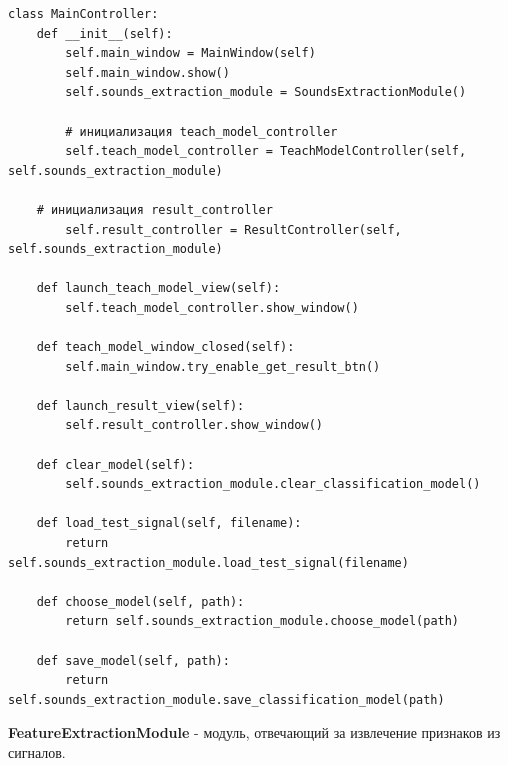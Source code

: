 \documentclass[utf8x, 14pt, oneside, a4paper]{article}
\begin{document}
		\begin{lstlisting}[caption=MainController]
class MainController:
	def __init__(self):
		self.main_window = MainWindow(self)
		self.main_window.show()
		self.sounds_extraction_module = SoundsExtractionModule()
		
		# инициализация teach_model_controller
		self.teach_model_controller = TeachModelController(self, self.sounds_extraction_module)
	
	# инициализация result_controller
		self.result_controller = ResultController(self, self.sounds_extraction_module)
	
	def launch_teach_model_view(self):
		self.teach_model_controller.show_window()
	
	def teach_model_window_closed(self):
		self.main_window.try_enable_get_result_btn()
	
	def launch_result_view(self):
		self.result_controller.show_window()
	
	def clear_model(self):
		self.sounds_extraction_module.clear_classification_model()
	
	def load_test_signal(self, filename):
		return self.sounds_extraction_module.load_test_signal(filename)
	
	def choose_model(self, path):
		return self.sounds_extraction_module.choose_model(path)
	
	def save_model(self, path):
		return self.sounds_extraction_module.save_classification_model(path)
		\end{lstlisting}
		
		{\bf FeatureExtractionModule} - модуль, отвечающий за извлечение признаков из сигналов.
		
\end{document}

